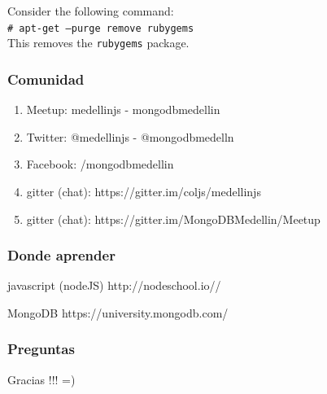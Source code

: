 \documentclass{beamer}
\begin{document}
\begin{frame}[fragile]

\newcommand{\shellcmd}[1]{\\\indent\indent\texttt{\footnotesize\# #1}\\}
  \noindent Consider the following command:
  \shellcmd{apt-get --purge remove rubygems}
  This removes the \texttt{rubygems} package.

\end{frame}

\begin{frame}
\frametitle{Comunidad}
\begin{enumerate}
\item Meetup: medellinjs  - mongodbmedellin
\pause
\item Twitter: @medellinjs - @mongodbmedelln
\pause
\item Facebook: /mongodbmedellin
\pause
\item gitter (chat): https://gitter.im/coljs/medellinjs
\pause
\item gitter (chat): https://gitter.im/MongoDBMedellin/Meetup
\end{enumerate}
\end{frame}
\begin{frame}
\frametitle{Donde aprender}
\footnotesize{
\begin{thebibliography}{99} %
 javascript (nodeJS)
\newblock http://nodeschool.io//
\end{thebibliography}
}

\footnotesize{
\begin{thebibliography}{99} %
 MongoDB
\newblock https://university.mongodb.com/
\end{thebibliography}
}
\end{frame}

\begin{frame}
\frametitle{Preguntas}
\end{frame}

\begin{frame}
\Huge{\centerline{Gracias !!! =)}}
\end{frame}
\end{document}
